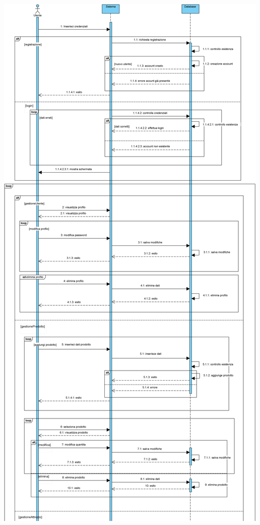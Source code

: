 \documentclass[a4paper, titlepage]{article}
\begin{document}
\newpage
\includegraphics[scale=0.40]{Immagini/Sequence Diagram_Brew Day!_definitivo_1.png}
\newpage
\end{document}
